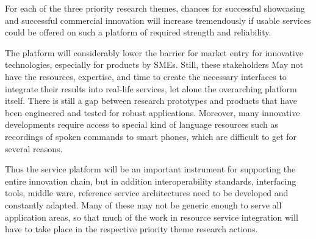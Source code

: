 \documentclass[10pt, plain]{../../metanetpaper}
\begin{document}
\begin{multicols}{2}
For each of the three priority research themes, chances for successful showcasing and successful commercial innovation will increase tremendously if usable services could be offered on such a platform of required strength and reliability.
 
The platform will considerably lower the barrier for market entry for innovative technologies, especially for products by SMEs. Still, these stakeholders May not have the resources, expertise, and time to create the necessary interfaces to integrate their results into real-life services, let alone the overarching platform itself. There is still a gap between research prototypes and products that have been engineered and tested for robust applications. Moreover, many innovative developments require access to special kind of language resources such as recordings of spoken commands to smart phones, which are difficult to get for several reasons.
 
Thus the service platform will be an important instrument for supporting the entire innovation chain, but in addition interoperability standards, interfacing tools, middle ware, reference service architectures need to be developed and constantly adapted. Many of these may not be generic enough to serve all application areas, so that much of the work in resource service integration will have to take place in the respective priority theme research actions.





\end{multicols}
\end{document}
